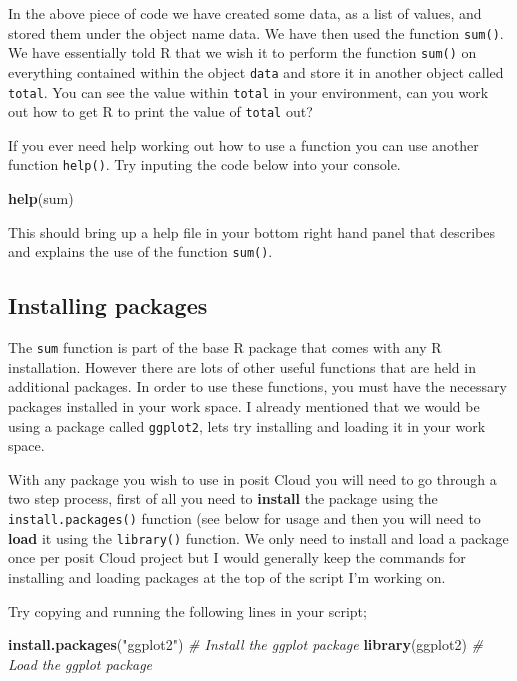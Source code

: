 \documentclass[
]{book}
\newenvironment{Shaded}{\begin{snugshade}}{\end{snugshade}}
\newcommand{\CommentTok}[1]{\textcolor[rgb]{0.56,0.35,0.01}{\textit{#1}}}
\newcommand{\FunctionTok}[1]{\textcolor[rgb]{0.13,0.29,0.53}{\textbf{#1}}}
\newcommand{\NormalTok}[1]{#1}
\newcommand{\StringTok}[1]{\textcolor[rgb]{0.31,0.60,0.02}{#1}}
\begin{document}
In the above piece of code we have created some data, as a list of values, and stored them under the object name data. We have then used the function \texttt{sum()}. We have essentially told R that we wish it to perform the function \texttt{sum()} on everything contained within the object \texttt{data} and store it in another object called \texttt{total}. You can see the value within \texttt{total} in your environment, can you work out how to get R to print the value of \texttt{total} out?

If you ever need help working out how to use a function you can use another function \texttt{help()}. Try inputing the code below into your console.

\begin{Shaded}
\begin{Highlighting}[]
\FunctionTok{help}\NormalTok{(sum)}
\end{Highlighting}
\end{Shaded}

This should bring up a help file in your bottom right hand panel that describes and explains the use of the function \texttt{sum()}.

\hypertarget{installing-packages}{%
\subsection{Installing packages}\label{installing-packages}}

The \texttt{sum} function is part of the base R package that comes with any R installation. However there are lots of other useful functions that are held in additional packages. In order to use these functions, you must have the necessary packages installed in your work space. I already mentioned that we would be using a package called \texttt{ggplot2}, lets try installing and loading it in your work space.

With any package you wish to use in posit Cloud you will need to go through a two step process, first of all you need to \textbf{install} the package using the \texttt{install.packages()} function (see below for usage and then you will need to \textbf{load} it using the \texttt{library()} function. We only need to install and load a package once per posit Cloud project but I would generally keep the commands for installing and loading packages at the top of the script I'm working on.

Try copying and running the following lines in your script;

\begin{Shaded}
\begin{Highlighting}[]
\FunctionTok{install.packages}\NormalTok{(}\StringTok{"ggplot2"}\NormalTok{) }\CommentTok{\# Install the ggplot package}
\FunctionTok{library}\NormalTok{(ggplot2) }\CommentTok{\# Load the ggplot package}
\end{Highlighting}
\end{Shaded}
\end{document}

